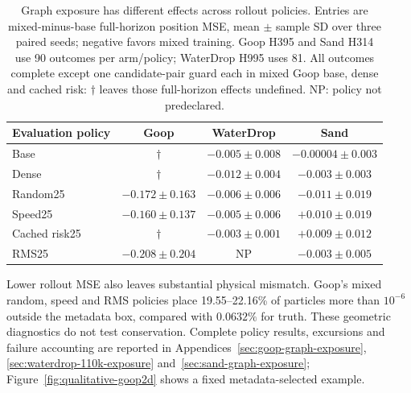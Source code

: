 \begin{table}[t]
\centering\scriptsize
\caption{Graph exposure has different effects across rollout policies. Entries are mixed-minus-base full-horizon position MSE, mean $\pm$ sample SD over three paired seeds; negative favors mixed training. Goop H395 and Sand H314 use 90 outcomes per arm/policy; WaterDrop H995 uses 81. All outcomes complete except one candidate-pair guard each in mixed Goop base, dense and cached risk: $\dagger$ leaves those full-horizon effects undefined. NP: policy not predeclared.}
\label{tab:goop-rollouts}
\setlength{\tabcolsep}{3pt}
\renewcommand{\arraystretch}{1.2}
\begin{tabular}{lccc}
\toprule
Evaluation policy & Goop & WaterDrop & Sand\\
\midrule
Base & $\dagger$ & $-0.005\pm0.008$ & $-0.00004\pm0.003$\\
Dense & $\dagger$ & $-0.012\pm0.004$ & $-0.003\pm0.003$\\
Random25 & $-0.172\pm0.163$ & $-0.006\pm0.006$ & $-0.011\pm0.019$\\
Speed25 & $-0.160\pm0.137$ & $-0.005\pm0.006$ & $+0.010\pm0.019$\\
Cached risk25 & $\dagger$ & $-0.003\pm0.001$ & $+0.009\pm0.012$\\
RMS25 & $-0.208\pm0.204$ & NP & $-0.003\pm0.005$\\
\bottomrule
\end{tabular}
\end{table}


Lower rollout MSE also leaves substantial physical mismatch. Goop's mixed random, speed and RMS policies place 19.55--22.16\% of particles more than $10^{-6}$ outside the metadata box, compared with $0.0632\%$ for truth. These geometric diagnostics do not test conservation. Complete policy results, excursions and failure accounting are reported in Appendices~\ref{sec:goop-graph-exposure}, \ref{sec:waterdrop-110k-exposure} and~\ref{sec:sand-graph-exposure}; Figure~\ref{fig:qualitative-goop2d} shows a fixed metadata-selected example.

